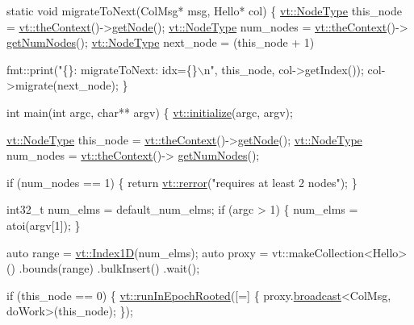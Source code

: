 \begin{DoxyCodeInclude}
\textcolor{keyword}{static} \textcolor{keywordtype}{void} migrateToNext(ColMsg* msg, Hello* col) \{
  \hyperlink{namespacevt_a866da9d0efc19c0a1ce79e9e492f47e2}{vt::NodeType} this\_node = \hyperlink{namespacevt_a26551fe0e6e6a1371111df5b12c7e92c}{vt::theContext}()->\hyperlink{structvt_1_1ctx_1_1_context_a0d52c263ce8516546a67443d9a86fa5f}{getNode}();
  \hyperlink{namespacevt_a866da9d0efc19c0a1ce79e9e492f47e2}{vt::NodeType} num\_nodes = \hyperlink{namespacevt_a26551fe0e6e6a1371111df5b12c7e92c}{vt::theContext}()->
      \hyperlink{structvt_1_1ctx_1_1_context_a7f41071aadf6d5fa9e1b6c703c5ff19d}{getNumNodes}();
  \hyperlink{namespacevt_a866da9d0efc19c0a1ce79e9e492f47e2}{vt::NodeType} next\_node = (this\_node + 1) %

  fmt::print(\textcolor{stringliteral}{"\{\}: migrateToNext: idx=\{\}\(\backslash\)n"}, this\_node, col->getIndex());
  col->migrate(next\_node);
\}

\textcolor{keywordtype}{int} main(\textcolor{keywordtype}{int} argc, \textcolor{keywordtype}{char}** argv) \{
  \hyperlink{namespacevt_aaa266774ea8339c58be0202b00fafa62}{vt::initialize}(argc, argv);

  \hyperlink{namespacevt_a866da9d0efc19c0a1ce79e9e492f47e2}{vt::NodeType} this\_node = \hyperlink{namespacevt_a26551fe0e6e6a1371111df5b12c7e92c}{vt::theContext}()->\hyperlink{structvt_1_1ctx_1_1_context_a0d52c263ce8516546a67443d9a86fa5f}{getNode}();
  \hyperlink{namespacevt_a866da9d0efc19c0a1ce79e9e492f47e2}{vt::NodeType} num\_nodes = \hyperlink{namespacevt_a26551fe0e6e6a1371111df5b12c7e92c}{vt::theContext}()->
      \hyperlink{structvt_1_1ctx_1_1_context_a7f41071aadf6d5fa9e1b6c703c5ff19d}{getNumNodes}();

  \textcolor{keywordflow}{if} (num\_nodes == 1) \{
    \textcolor{keywordflow}{return} \hyperlink{namespacevt_aff96ace008dc847d4c0f44cfa5dfb3a0}{vt::rerror}(\textcolor{stringliteral}{"requires at least 2 nodes"});
  \}

  int32\_t num\_elms = default\_num\_elms;
  \textcolor{keywordflow}{if} (argc > 1) \{
    num\_elms = atoi(argv[1]);
  \}

  \textcolor{keyword}{auto} range = \hyperlink{namespacevt_a5540efc78234273e1796fb003fe4d234}{vt::Index1D}(num\_elms);
  \textcolor{keyword}{auto} proxy = vt::makeCollection<Hello>()
    .bounds(range)
    .bulkInsert()
    .wait();

  \textcolor{keywordflow}{if} (this\_node == 0) \{
    \hyperlink{namespacevt_a9f5cbbc484d7f14f2ad0ee46d62dfb6e}{vt::runInEpochRooted}([=] \{ proxy.\hyperlink{structvt_1_1objgroup_1_1proxy_1_1_proxy_a0b716ca776b1f06e0d7d45afbe9e5274}{broadcast}<ColMsg, doWork>(this\_node); \});


\end{DoxyCodeInclude}
